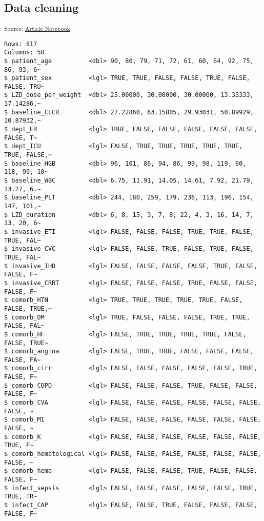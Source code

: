 \documentclass[
  letterpaper,
  DIV=11,
  numbers=noendperiod]{scrartcl}
\begin{document}
\subsection{Data cleaning}\label{data-cleaning}

\textsubscript{Source:
\href{https://AnTangQuoc.github.io/LZD-TP-pred-model/index.qmd.html}{Article
Notebook}}

\begin{verbatim}
Rows: 817
Columns: 58
$ patient_age          <dbl> 90, 80, 79, 71, 72, 61, 60, 64, 92, 75, 86, 93, 6~
$ patient_sex          <lgl> TRUE, TRUE, FALSE, FALSE, TRUE, FALSE, FALSE, TRU~
$ LZD_dose_per_weight  <dbl> 25.00000, 30.00000, 30.00000, 13.33333, 17.14286,~
$ baseline_CLCR        <dbl> 27.22860, 63.15805, 29.93031, 50.89929, 10.87932,~
$ dept_ER              <lgl> TRUE, FALSE, FALSE, FALSE, FALSE, FALSE, FALSE, T~
$ dept_ICU             <lgl> FALSE, TRUE, TRUE, TRUE, TRUE, TRUE, TRUE, FALSE,~
$ baseline_HGB         <dbl> 96, 101, 86, 94, 86, 99, 98, 119, 60, 118, 99, 10~
$ baseline_WBC         <dbl> 6.75, 11.91, 14.05, 14.61, 7.92, 21.79, 13.27, 6.~
$ baseline_PLT         <dbl> 244, 180, 259, 179, 236, 113, 196, 154, 147, 101,~
$ LZD_duration         <dbl> 6, 8, 15, 3, 7, 8, 22, 4, 3, 16, 14, 7, 13, 20, 6~
$ invasive_ETI         <lgl> FALSE, FALSE, FALSE, TRUE, TRUE, FALSE, TRUE, FAL~
$ invasive_CVC         <lgl> FALSE, FALSE, TRUE, FALSE, TRUE, FALSE, TRUE, FAL~
$ invasive_IHD         <lgl> FALSE, FALSE, FALSE, FALSE, TRUE, FALSE, FALSE, F~
$ invasive_CRRT        <lgl> FALSE, FALSE, FALSE, TRUE, FALSE, FALSE, FALSE, F~
$ comorb_HTN           <lgl> TRUE, TRUE, TRUE, TRUE, TRUE, FALSE, FALSE, TRUE,~
$ comorb_DM            <lgl> TRUE, FALSE, FALSE, FALSE, TRUE, TRUE, FALSE, FAL~
$ comorb_HF            <lgl> FALSE, TRUE, TRUE, TRUE, TRUE, FALSE, FALSE, TRUE~
$ comorb_angina        <lgl> FALSE, TRUE, TRUE, FALSE, FALSE, FALSE, FALSE, FA~
$ comorb_cirr          <lgl> FALSE, FALSE, FALSE, FALSE, FALSE, TRUE, FALSE, F~
$ comorb_COPD          <lgl> FALSE, FALSE, FALSE, TRUE, FALSE, FALSE, FALSE, F~
$ comorb_CVA           <lgl> FALSE, FALSE, FALSE, FALSE, FALSE, FALSE, FALSE, ~
$ comorb_MI            <lgl> FALSE, FALSE, FALSE, FALSE, FALSE, FALSE, FALSE, ~
$ comorb_K             <lgl> FALSE, FALSE, FALSE, FALSE, FALSE, FALSE, TRUE, F~
$ comorb_hematological <lgl> FALSE, FALSE, FALSE, FALSE, FALSE, FALSE, FALSE, ~
$ comorb_hema          <lgl> FALSE, FALSE, FALSE, TRUE, FALSE, FALSE, FALSE, F~
$ infect_sepsis        <lgl> FALSE, FALSE, FALSE, FALSE, FALSE, TRUE, TRUE, TR~
$ infect_CAP           <lgl> FALSE, FALSE, TRUE, FALSE, FALSE, FALSE, FALSE, F~

\end{verbatim}
\end{document}
